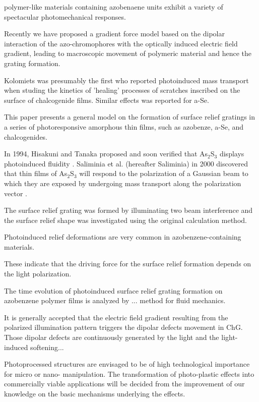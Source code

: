 polymer-like materials containing azobenaene units exhibit a variety
of spectacular photomechanical responses.


Recently we have proposed a gradient force model based on the dipolar
interaction of the azo-chromophores with the optically induced
electric field gradient, leading to macroscopic movement of polymeric
material and hence the grating formation.

Kolomiets was presumably the first who reported photoinduced mass
transport when studing the kinetics of 'healing' processes of
scratches inscribed on the surface of chalcogenide films. Similar
effects was reported for a-Se.

This paper presents a general model on the formation of surface relief
gratings in a series of photoresponsive amorphous thin films, such as
azobenze, a-Se, and chalcogenides.

In 1994, Hisakuni and Tanaka proposed and soon verified that
As$_{2}$S$_{3}$ displays photoinduced fluidity
\cite{hisakuni95}. Saliminia et al. (hereafter Saliminia) in 2000
discovered that thin films of As$_{2}$S$_{3}$ will respond to the
polarization of a Gaussian beam to which they are exposed by
undergoing mass transport along the polarization vector
\cite{saliminia}.

The surface relief grating was formed by illuminating
two beam interference and the surface relief shape was investigated
using the original calculation method.

Photoinduced relief deformations are very common in
azobenzene-containing materials.

These indicate that the driving force for the surface relief formation
depends on the light polarization.

The time evolution of photoinduced surface relief grating formation on
azobenzene polymer films is analyzed by ... method for fluid
mechanics.

It is generally accepted that the electric field gradient resulting
from the polarized illumination pattern triggers the dipolar defects
movement in ChG. Those dipolar defects are continuously generated by
the light and the light-induced softening...

Photoprocessed structures are
envisaged to be of high technological importance for micro or nano-
manipulation. The transformation of photo-plastic effects into
commercially viable applications will be decided from the improvement
of our knowledge on the basic mechanisms underlying the effects.


